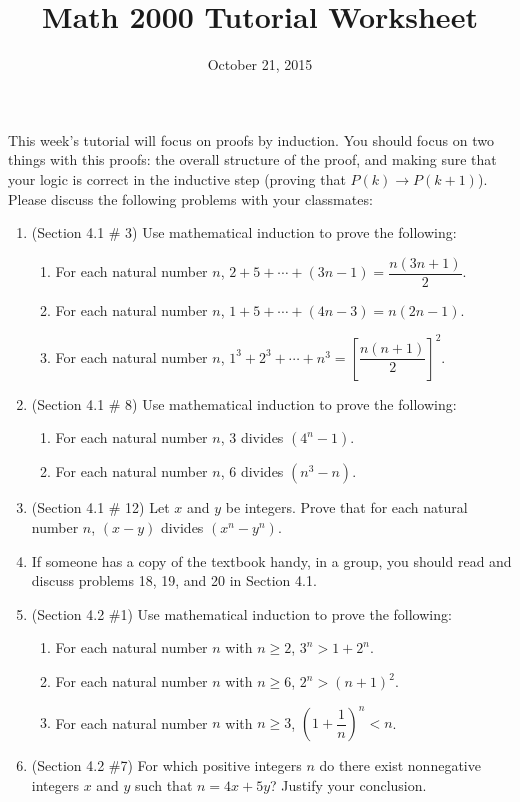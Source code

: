 \documentclass[letterpaper,12pt]{article}
\date{October 21, 2015}
\title{Math 2000 Tutorial Worksheet}
\begin{document}
\maketitle

 This week's tutorial will focus on proofs by induction. You should focus on two things with this proofs: the overall structure of the proof, and making sure that your logic is correct in the inductive step (proving that $P(k)\to P(k+1)$). Please discuss the following problems with your classmates:
\begin{enumerate}
 \item (Section 4.1 \# 3) Use mathematical induction to prove the following:
 
 \begin{enumerate}
 \item For each natural number $n$, $2+5+\cdots + (3n-1) = \dfrac{n(3n+1)}{2}$.
 \item For each natural number $n$, $1+5+\cdots + (4n-3) = n(2n-1)$.
 \item For each natural number $n$, $1^3+2^3+\cdots + n^3 = \left[\dfrac{n(n+1)}{2}\right]^2$.
 \end{enumerate}
 
 \item (Section 4.1 \# 8) Use mathematical induction to prove the following:
 \begin{enumerate}
 \item For each natural number $n$, 3 divides $(4^n-1)$.
 \item For each natural number $n$, 6 divides $(n^3-n)$.
 \end{enumerate}
 \item (Section 4.1 \# 12) Let $x$ and $y$ be integers. Prove that for each natural number $n$, $(x-y)$ divides $(x^n-y^n)$.
 
 \item If someone has a copy of the textbook handy, in a group, you should read and discuss problems 18, 19, and 20 in Section 4.1.
 
 \item (Section 4.2 \#1) Use mathematical induction to prove the following:
 \begin{enumerate}
 \item For each natural number $n$ with $n\geq 2$, $3^n>1+2^n$.
 \item For each natural number $n$ with $n\geq 6$, $2^n>(n+1)^2$.
 \item For each natural number $n$ with $n\geq 3$, $\left(1+\dfrac{1}{n}\right)^n<n$.
 \end{enumerate}
 \item (Section 4.2 \#7) For which positive integers $n$ do there exist nonnegative integers $x$ and $y$ such that $n=4x+5y$? Justify your conclusion.
\end{enumerate}
\end{document}
